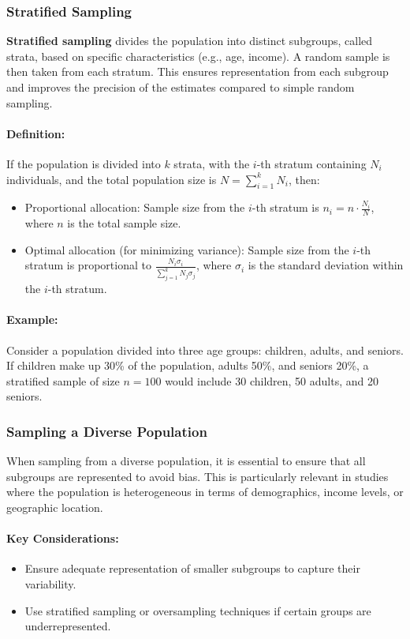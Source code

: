 \documentclass[12pt,a4paper]{article}
\begin{document}
\subsubsection*{Stratified Sampling}
\textbf{Stratified sampling} divides the population into distinct subgroups, called strata, based on specific characteristics (e.g., age, income). A random sample is then taken from each stratum. This ensures representation from each subgroup and improves the precision of the estimates compared to simple random sampling.

\paragraph{Definition:}
If the population is divided into $k$ strata, with the $i$-th stratum containing $N_i$ individuals, and the total population size is $N = \sum_{i=1}^k N_i$, then:
\begin{itemize}
    \item Proportional allocation: Sample size from the $i$-th stratum is $n_i = n \cdot \frac{N_i}{N}$, where $n$ is the total sample size.
    \item Optimal allocation (for minimizing variance): Sample size from the $i$-th stratum is proportional to $\frac{N_i \sigma_i}{\sum_{j=1}^k N_j \sigma_j}$, where $\sigma_i$ is the standard deviation within the $i$-th stratum.
\end{itemize}

\paragraph{Example:}
Consider a population divided into three age groups: children, adults, and seniors. If children make up 30\% of the population, adults 50\%, and seniors 20\%, a stratified sample of size $n=100$ would include 30 children, 50 adults, and 20 seniors.

\subsubsection*{Sampling a Diverse Population}
When sampling from a diverse population, it is essential to ensure that all subgroups are represented to avoid bias. This is particularly relevant in studies where the population is heterogeneous in terms of demographics, income levels, or geographic location. 

\paragraph{Key Considerations:}
\begin{itemize}
    \item Ensure adequate representation of smaller subgroups to capture their variability.
    \item Use stratified sampling or oversampling techniques if certain groups are underrepresented.
\end{itemize}
\end{document}
